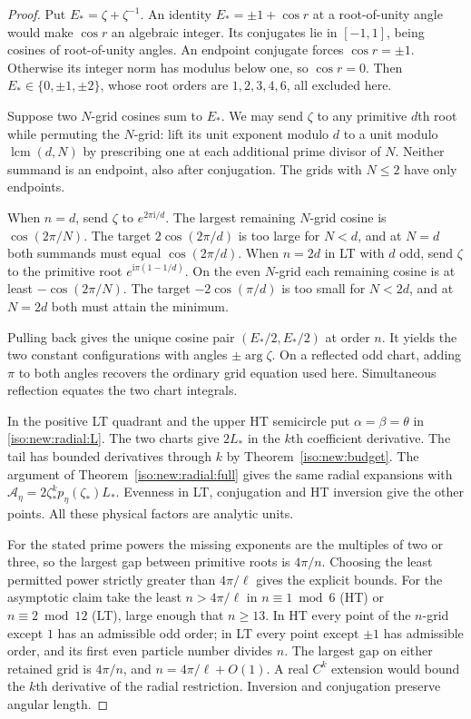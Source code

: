 \documentclass[11pt]{article}
\numberwithin{equation}{section}
\theoremstyle{definition}
\newcommand{\ii}{\mathrm i}
\begin{document}
\begin{proof}
Put $E_*=\zeta+\zeta^{-1}$. An identity $E_*=\pm1+\cos r$ at a root-of-unity angle
would make $\cos r$ an algebraic integer. Its conjugates lie in
$[-1,1]$, being cosines of root-of-unity angles. An endpoint conjugate
forces $\cos r=\pm1$. Otherwise its integer norm has modulus below one,
so $\cos r=0$. Then $E_*\in\{0,\pm1,\pm2\}$, whose root orders
are $1,2,3,4,6$, all excluded here.

Suppose two $N$-grid cosines sum to $E_*$. We may send $\zeta$ to
any primitive $d$th root while permuting the $N$-grid: lift its unit
exponent modulo $d$ to a unit modulo $\operatorname{lcm}(d,N)$ by
prescribing one at each additional prime divisor of $N$. Neither summand
is an endpoint, also after conjugation. The grids with $N\le2$ have
only endpoints.

When $n=d$, send $\zeta$ to $e^{2\pi\ii/d}$. The largest remaining
$N$-grid cosine is $\cos(2\pi/N)$. The target $2\cos(2\pi/d)$ is too
large for $N<d$, and at $N=d$ both summands must equal $\cos(2\pi/d)$.
When $n=2d$ in LT with $d$ odd, send $\zeta$ to the primitive root
$e^{\ii\pi(1-1/d)}$. On the even $N$-grid each remaining cosine is
at least $-\cos(2\pi/N)$. The target $-2\cos(\pi/d)$ is too small
for $N<2d$, and at $N=2d$ both must attain the minimum.

Pulling back gives the unique cosine pair $(E_*/2,E_*/2)$ at order
$n$. It yields the two constant configurations with angles
$\pm\arg\zeta$. On a reflected odd chart, adding $\pi$ to both
angles recovers the ordinary grid equation used here. Simultaneous
reflection equates the two chart integrals.

In the positive LT quadrant and the upper HT semicircle put
$\alpha=\beta=\theta$ in \eqref{iso:new:radial:L}. The two charts
give $2L_*$ in the $k$th coefficient derivative. The tail has bounded
derivatives through $k$ by Theorem~\ref{iso:new:budget}. The
argument of Theorem~\ref{iso:new:radial:full} gives the same radial
expansions with $\mathcal A_\eta=2\zeta_*^kp_\eta(\zeta_*)L_*$.
Evenness in LT, conjugation and HT inversion give the other points.
All these physical factors are analytic units.

For the stated prime powers the missing exponents are the multiples
of two or three, so the largest gap between primitive roots is
$4\pi/n$. Choosing the least permitted power strictly greater than
$4\pi/\ell$ gives the explicit bounds. For the asymptotic claim
take the least $n>4\pi/\ell$ in $n\equiv1\bmod6$ (HT) or
$n\equiv2\bmod12$ (LT), large enough that $n\ge 13$.
In HT every point of the $n$-grid except $1$ has an admissible odd
order; in LT every point except $\pm1$ has admissible order, and
its first even particle number divides $n$. The largest gap on
either retained grid is $4\pi/n$, and $n=4\pi/\ell+O(1)$.
A real $C^k$ extension would bound the $k$th derivative of the
radial restriction. Inversion and conjugation preserve angular
length.
\end{proof}
\end{document}
